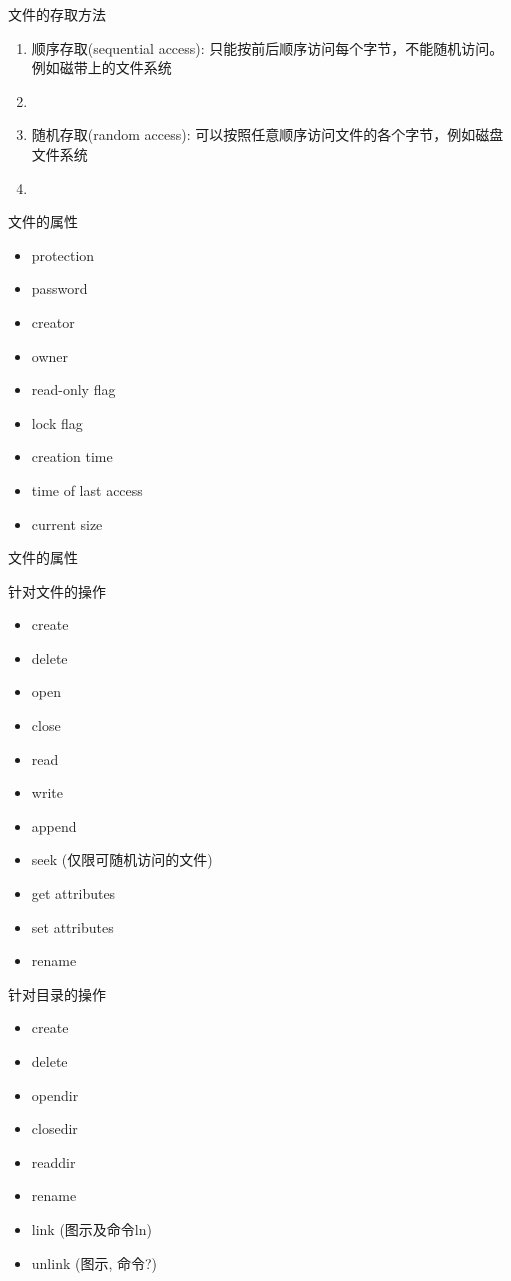 \documentclass[xcolor=svgnames]{beamer}
\begin{document}
\begin{CJK*}{UTF8}{gbsn}
\begin{frame}{文件的存取方法}
\begin{enumerate}
\item 顺序存取(sequential access): 只能按前后顺序访问每个字节，不能随机访问。例如磁带上的文件系统
\item[]
\item 随机存取(random access): 可以按照任意顺序访问文件的各个字节，例如磁盘文件系统
\item[]
\end{enumerate}
\end{frame}

\begin{frame}{文件的属性}
\begin{itemize}
\item protection
\item password
\item creator
\item owner
\item read-only flag
\item lock flag
\item creation time
\item time of last access
\item current size
\end{itemize}
\end{frame}

\begin{frame}{文件的属性}
\lstset{language=C, frame=trbl}

\end{frame}

\begin{frame}{针对文件的操作}
\begin{itemize}
\item create
\item delete
\item open
\item close
\item read
\item write
\item append
\item seek (仅限可随机访问的文件)
\item get attributes 
\item set attributes
\item rename
\end{itemize}
\end{frame}

\begin{frame}{针对目录的操作}
\begin{itemize}
\item create
\item delete
\item opendir
\item closedir
\item readdir
\item rename
\item link (图示及命令ln)
\item unlink (图示, 命令?)
\end{itemize}
\end{frame}


\end{CJK*}
\end{document}
